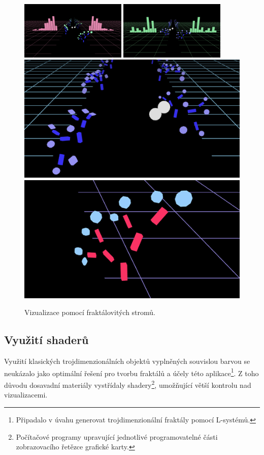 \documentclass[thesis=B, czech]{FITthesis}[2019/03/06]
\begin{document}
\begin{figure}
    \centering
    \noindent
    \includegraphics[width=0.45\textwidth]{images/previous_versions/fraviz13.png}\hspace{0.05\textwidth}%
    \includegraphics[width=0.45\textwidth]{images/previous_versions/fraviz12.png}\\[1em]
    \includegraphics[width=0.45\linewidth]{images/previous_versions/tr6.png}\hspace{0.05\textwidth}%
    \includegraphics[width=0.45\linewidth]{images/previous_versions/tr5.png}\par
    \caption{Vizualizace pomocí fraktálovitých stromů.}
    \label{fig:fractalTrees}
\end{figure}


\newpage


\subsection*{Využití shaderů} \label{subs:vs}

Využití klasických trojdimenzionálních objektů vyplněných souvislou barvou se neukázalo jako optimální řešení pro tvorbu fraktálů a účely této aplikace\footnote{Připadalo v úvahu generovat trojdimenzionální fraktály pomocí L-systémů.}. Z toho důvodu dosavadní materiály vystřídaly shadery\footnote{Počítačové programy upravující jednotlivé programovatelné části zobrazovacího řetězce grafické karty.}, umožňující větší kontrolu nad vizualizacemi.
\end{document}
